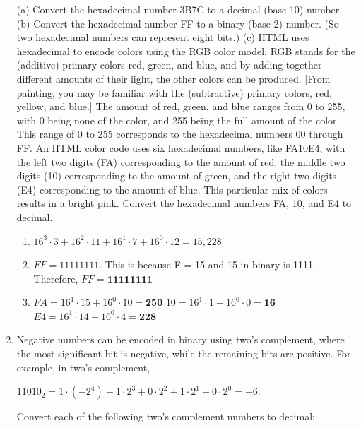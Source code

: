 \documentclass{article}
\begin{document}
\begin{enumerate}
    (a) Convert the hexadecimal number 3B7C to a decimal (base 10) number.\newline
    (b) Convert the hexadecimal number FF to a binary (base 2) number. (So two hexadecimal numbers can represent eight bits.)\newline
    (c) HTML uses hexadecimal to encode colors using the RGB color model. RGB stands for the (additive) primary colors red, green, and blue, and by adding together different amounts of their light, the other colors can be produced. [From painting, you may be familiar with the (subtractive) primary colors, red, yellow, and blue.] The amount of red, green, and blue ranges from 0 to 255, with 0 being none of the color, and 255 being the full amount of the color. This range of 0 to 255 corresponds to the hexadecimal numbers 00 through FF. An HTML color code uses six hexadecimal numbers, like FA10E4, with the left two digits (FA) corresponding to the amount of red, the middle two digits (10) corresponding to the amount of green, and the right two digits (E4) corresponding to the amount of blue. This particular mix of colors results in a bright pink. Convert the hexadecimal numbers FA, 10, and E4 to decimal.

    \begin{enumerate}
    \item[a)] \(16^3\cdot3 + 16^2\cdot11 + 16^1\cdot7 + 16^0\cdot12 = 15,228\)
    \item[b)] \(FF = 11111111\). This is because F = 15 and 15 in binary is 1111. Therefore, \(FF = \boldsymbol{11111111}\)
    \item[c)] \(FA = 16^1\cdot15 + 16^0\cdot10 = \boldsymbol{250}\)\newline
    \(10 = 16^1\cdot1 + 16^0\cdot0 = \boldsymbol{16}\)\newline
    \(E4 = 16^1\cdot14 + 16^0\cdot4 = \boldsymbol{228}\)\newline
    \end{enumerate}

    \item[Exercise 1.8] Negative numbers can be encoded in binary using two’s complement, where the most significant bit is negative, while the remaining bits are positive. For example, in two’s complement,\newline
    
    \(11010_2 = 1\cdot(-2^4) + 1\cdot2^3 + 0\cdot2^2 + 1\cdot2^1 + 0\cdot2^0 = -6\). \newline
    
    Convert each of the following two’s complement numbers to decimal:\newline


\end{enumerate}
\end{document}
